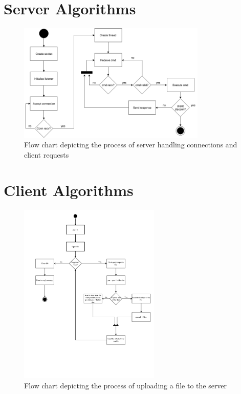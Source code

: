\documentclass[10pt,twocolumn]{witseiepaper}
\begin{document}
\newpage
\setcounter{figure}{0} 
\renewcommand{\thefigure}
{A\arabic{figure}}
\onecolumn
\begin{appendix} \label{sec:appendix}

\section{Server Algorithms}

\begin{figure}[h]
	\centering
	\includegraphics[width=0.8\textwidth]{Server.png}
	\caption{Flow chart depicting the process of server handling connections and client requests}
	\raggedright
	\label{fig:server}	
\end{figure}

\newpage
\section{Client Algorithms}

\begin{figure}[h]
	\centering
	\includegraphics[width=0.6\textwidth]{uploadfile.pdf}
	\caption{Flow chart depicting the process of uploading a file to the server}
	\raggedright
	\label{fig:upload}	
\end{figure}



\end{appendix}
\end{document}
